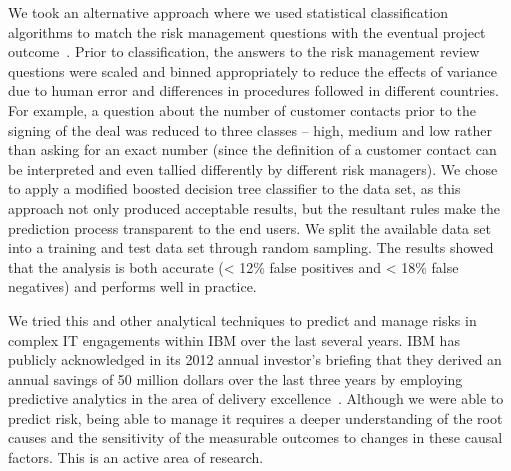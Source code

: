  We took an alternative approach where we used statistical classification algorithms to match the risk management questions with the eventual project outcome~\cite{risk28}. Prior to classification, the answers to the risk management review questions were scaled and binned appropriately to reduce the effects of variance due to human error and differences in procedures followed in different countries. For example, a question about the number of customer contacts prior to the signing of the deal was reduced to three classes – high, medium and low rather than asking for an exact number (since the definition of a customer contact can be interpreted and even tallied differently by different risk managers). We chose to apply a modified boosted decision tree classifier to the data set, as this approach not only produced acceptable results, but the resultant rules make the prediction process transparent to the end users. We split the available data set into a training and test data set through random sampling. The results showed that the analysis is both accurate (< 12\% false positives and < 18\% false negatives) and performs well in practice.

 We tried this and other analytical techniques to predict and manage risks in complex IT engagements within IBM over the last several years. IBM has publicly acknowledged in its 2012 annual investor's briefing that they derived an annual savings of 50 million dollars over the last three years by employing predictive analytics in the area of delivery excellence~\cite{ibm-investors-briefing}. Although we were able to predict risk, being able to manage it requires a deeper understanding of the root causes and the sensitivity of the measurable outcomes to changes in these causal factors. This is an active area of research.

\label{sec:risk}
